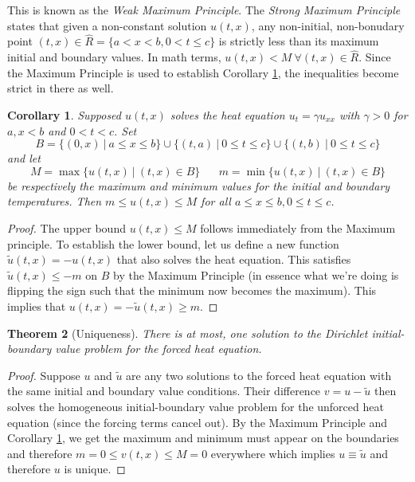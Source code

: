 \documentclass{article}
\newtheorem{theorem}{Theorem}[section]
\newtheorem{corollary}[theorem]{Corollary}
\numberwithin{equation}{section}
\begin{document}
This is known as the \textit{Weak Maximum Principle}. The \textit{Strong Maximum Principle} states that given a non-constant solution $u(t,x)$, any non-initial, non-bonudary point $(t,x) \in \hat{R} = \{a<x<b, 0<t\leq c\}$ is strictly less than its maximum initial and boundary values. In math terms, $u(t,x)<M \ \forall(t,x)\in \hat{R}$. Since the Maximum Principle is used to establish Corollary \ref{coro:mM}, the inequalities become strict in there as well. 
\begin{corollary}
    Supposed $u(t,x)$ solves the heat equation $u_t = \gamma u_{xx}$ with $\gamma > 0$ for $a,x<b$ and $0<t<c$. Set 
    \begin{equation*}
        B=\{(0,x) \ | \ a\leq x \leq b\} \cup \{(t,a)\ | \ 0\leq t \leq c\} \cup \{(t,b)\ | \ 0 \leq t \leq c\}
    \end{equation*}
    and let 
    \begin{equation*}
        M = \max \{u(t,x) \ | \ (t,x) \in B\} \hspace{20pt} m=\min \{u(t,x) \ | \ (t,x) \in B \}
    \end{equation*}
    be respectively the maximum and minimum values for the initial and boundary temperatures. Then $m \leq u(t,x) \leq M$ for all $a \leq x \leq b, 0 \leq t \leq c$.\label{coro:mM}
\end{corollary}
\begin{proof}
        The upper bound $u(t,x) \leq M$ follows immediately from the Maximum principle. To establish the lower bound, let us define a new function $\tilde{u}(t,x) = -u(t,x)$ that also solves the heat equation. This satisfies $\tilde{u}(t,x) \leq -m$ on $B$ by the Maximum Principle (in essence what we're doing is flipping the sign such that the minimum now becomes the maximum). This implies that $u(t,x) = -\tilde{u}(t,x) \geq m$.
    \end{proof}
\begin{theorem}[Uniqueness]
    There is at most, one solution to the Dirichlet initial-boundary value problem for the forced heat equation.
\end{theorem}
\begin{proof}
    Suppose $u$ and $\tilde{u}$ are any two solutions to the forced heat equation with the same initial and boundary value conditions. Their difference $v=u-\tilde{u}$ then solves the homogeneous initial-boundary value problem for the unforced heat equation (since the forcing terms cancel out). By the Maximum Principle and Corollary \ref{coro:mM}, we get the maximum and minimum must appear on the boundaries and therefore $m=0\leq v(t,x) \leq M=0$ everywhere which implies $u\equiv \tilde{u}$ and therefore $u$ is unique.
\end{proof}
\end{document}
